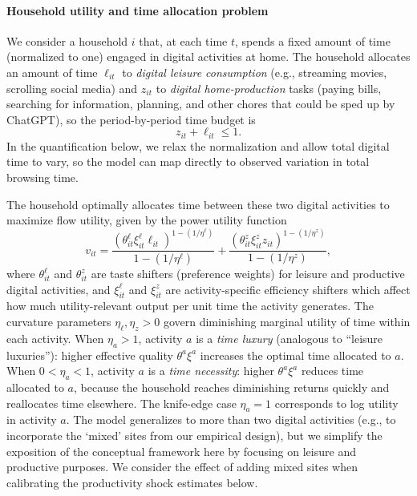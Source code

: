 \documentclass[12pt]{article}
\begin{document}
\paragraph{Household utility and time allocation problem}

We consider a household $i$ that, at each time $t$, spends a fixed amount of time (normalized to one) engaged in digital activities at home. The household allocates an amount of time $\ell_{it}$ to \textit{digital leisure consumption} (e.g., streaming movies, scrolling social media) and $z_{it}$ to \textit{digital home‑production} tasks (paying bills, searching for information, planning, and other chores that could be sped up by ChatGPT), so the period-by-period time budget is 
\begin{equation}
\label{eq:stylized-model-time-constraint}
    z_{it} + \ell_{it} \le 1.
\end{equation}
In the quantification below, we relax the normalization and allow total digital time to vary, so the model can map directly to observed variation in total browsing time.


The household optimally allocates time between these two digital activities to maximize flow utility, given by the power utility function 
\begin{equation} \label{eq:aggregator}
    v_{it} = \frac{(\theta_{it}^{\ell} \xi_{it}^{\ell} \ell_{it})^{1-(1/\eta^{\ell})} }{1-(1/\eta^{\ell})}  + \frac{(\theta_{it}^{z} \xi_{it}^{z} z_{it})^{1-(1/\eta^{z})} }{1-(1/\eta^{z})},  
\end{equation}
where $\theta^\ell_{it}$ and $\theta^z_{it}$ are taste shifters (preference weights) for leisure and productive digital activities,
and $\xi^\ell_{it}$ and $\xi^z_{it}$ are activity-specific efficiency shifters which affect how much utility-relevant output per unit time the activity generates.
The curvature parameters $\eta_\ell, \eta_z > 0$ govern diminishing marginal utility of time within each activity.
When $\eta_a > 1$, activity $a$ is a \emph{time luxury} (analogous to \cite{aguiar2021} ``leisure luxuries''): higher effective quality $\theta^a \xi^a$ increases the optimal time
allocated to $a$. When $0 < \eta_a < 1$, activity $a$ is a \emph{time necessity}: higher $\theta^a \xi^a$ reduces time allocated
to $a$, because the household reaches diminishing returns quickly and reallocates time elsewhere.
The knife-edge case $\eta_a = 1$ corresponds to log utility in activity $a$. The model generalizes to more than two digital activities (e.g., to incorporate the `mixed' sites from our empirical design), but we simplify the exposition of the conceptual framework here by focusing on leisure and productive purposes. We consider the effect of adding mixed sites when calibrating the productivity shock estimates below.
\end{document}
